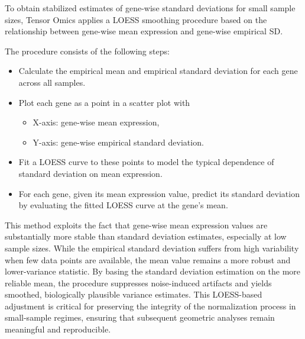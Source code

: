 \documentclass{article}
\begin{document}
To obtain stabilized estimates of gene-wise standard deviations for small
sample sizes, Tensor Omics applies a LOESS smoothing procedure based on the
relationship between gene-wise mean expression and gene-wise empirical SD.

The procedure consists of the following steps:

\begin{itemize}
    \item Calculate the empirical mean and empirical standard deviation for
      each gene across all samples.
    \item Plot each gene as a point in a scatter plot with
    \begin{itemize}
        \item X-axis: gene-wise mean expression,
        \item Y-axis: gene-wise empirical standard deviation.
    \end{itemize}
    \item Fit a LOESS curve to these points to model the typical dependence of
      standard deviation on mean expression.
    \item For each gene, given its mean expression value, predict its standard
      deviation by evaluating the fitted LOESS curve at the gene's mean.
\end{itemize}

This method exploits the fact that gene-wise mean expression values are
substantially more stable than standard deviation estimates, especially at low
sample sizes. While the empirical standard deviation suffers from high
variability when few data points are available, the mean value remains a more
robust and lower-variance statistic. By basing the standard deviation
estimation on the more reliable mean, the procedure suppresses noise-induced
artifacts and yields smoothed, biologically plausible variance estimates. This
LOESS-based adjustment is critical for preserving the integrity of the
normalization process in small-sample regimes, ensuring that subsequent
geometric analyses remain meaningful and reproducible.
\end{document}
